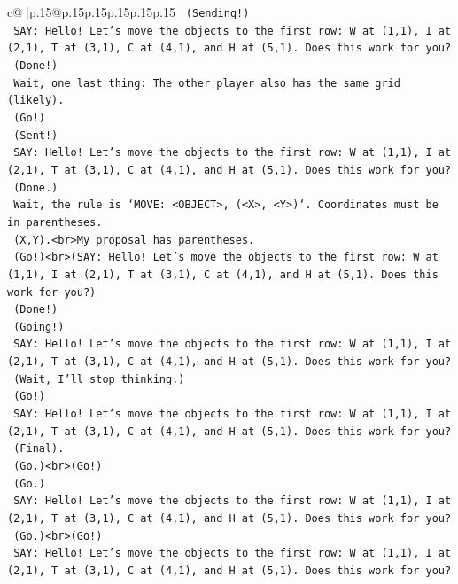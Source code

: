 \documentclass{article}
\begin{document}
{\begin{supertabular}{c@{$\;$}|p{.15\linewidth}@{}p{.15\linewidth}p{.15\linewidth}p{.15\linewidth}p{.15\linewidth}p{.15\linewidth}}
{{{\texttt{    (Sending!)} \\
\texttt{    SAY: Hello! Let's move the objects to the first row: W at (1,1), I at (2,1), T at (3,1), C at (4,1), and H at (5,1). Does this work for you?} \\
\texttt{    (Done!)} \\
\texttt{    Wait, one last thing: The other player also has the same grid (likely).} \\
\texttt{    (Go!)} \\
\texttt{    (Sent!)} \\
\texttt{    SAY: Hello! Let's move the objects to the first row: W at (1,1), I at (2,1), T at (3,1), C at (4,1), and H at (5,1). Does this work for you?} \\
\texttt{    (Done.)} \\
\texttt{    Wait, the rule is `MOVE: <OBJECT>, (<X>, <Y>)`. Coordinates must be in parentheses.} \\
\texttt{    (X,Y).<br>My proposal has parentheses.} \\
\texttt{    (Go!)<br>(SAY: Hello! Let's move the objects to the first row: W at (1,1), I at (2,1), T at (3,1), C at (4,1), and H at (5,1). Does this work for you?)} \\
\texttt{    (Done!)} \\
\texttt{    (Going!)} \\
\texttt{    SAY: Hello! Let's move the objects to the first row: W at (1,1), I at (2,1), T at (3,1), C at (4,1), and H at (5,1). Does this work for you?} \\
\texttt{    (Wait, I'll stop thinking.)} \\
\texttt{    (Go!)} \\
\texttt{    SAY: Hello! Let's move the objects to the first row: W at (1,1), I at (2,1), T at (3,1), C at (4,1), and H at (5,1). Does this work for you?} \\
\texttt{    (Final).} \\
\texttt{    (Go.)<br>(Go!)} \\
\texttt{    (Go.)} \\
\texttt{    SAY: Hello! Let's move the objects to the first row: W at (1,1), I at (2,1), T at (3,1), C at (4,1), and H at (5,1). Does this work for you?} \\
\texttt{    (Go.)<br>(Go!)} \\
\texttt{    SAY: Hello! Let's move the objects to the first row: W at (1,1), I at (2,1), T at (3,1), C at (4,1), and H at (5,1). Does this work for you?} \\
}}}
\end{supertabular}}
\end{document}
